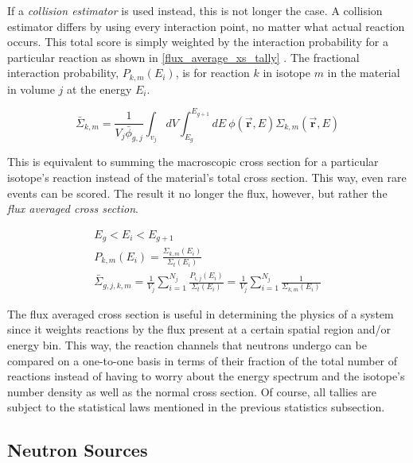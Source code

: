 If a \emph{collision estimator} is used instead, this is not longer the case.  A collision estimator differs by using every interaction point, no matter what actual reaction occurs.  This total score is simply weighted by the interaction probability for a particular reaction as shown in \eqref{flux_average_xs_tally} \cite{jaakko}.  The fractional interaction probability, $P_{k,m}(E_i)$, is for reaction $k$ in isotope $m$ in the material in volume $j$ at the energy $E_i$.

\begin{equation}
\label{flux_average_xs}
\bar{\Sigma}_{k,m} =  \frac{1}{V_j \bar{\phi}_{g,j} } \int_{v_j} dV \int_{E_g}^{E_{g+1}} dE \: \phi(\boldsymbol{\vec{r}},E) \Sigma_{k,m}(\boldsymbol{\vec{r}},E)
\end{equation}

This is equivalent to summing the macroscopic cross section for a particular isotope's reaction instead of the material's total cross section.  This way, even rare events can be scored.  The result it no longer the flux, however, but rather the \emph{flux averaged cross section}.  

\begin{equation}
\label{flux_average_xs_tally}
\begin{gathered}
E_g < E_i < E_{g+1} \\
P_{k,m}(E_i)= \frac{\Sigma_{k,m}(E_i)}{\Sigma_t(E_i)} \\
\bar{\Sigma}_{g,j,k,m} =  \frac{1}{V_j} \sum_{i=1}^{N_j} \frac{P_{i,j}(E_i)}{\Sigma_t(E_i)} = \frac{1}{V_j} \sum_{i=1}^{N_j} \frac{1}{\Sigma_{k,m}(E_i)}
\end{gathered}
\end{equation}

The flux averaged cross section is useful in determining the physics of a system since it weights reactions by the flux present at a certain spatial region and/or energy bin.  This way, the reaction channels that neutrons undergo can be compared on a one-to-one basis in terms of their fraction of the total number of reactions instead of having to worry about the energy spectrum and the isotope's number density as well as the normal cross section.  Of course, all tallies are subject to the statistical laws mentioned in the previous statistics subsection.


\subsection{Neutron Sources}

